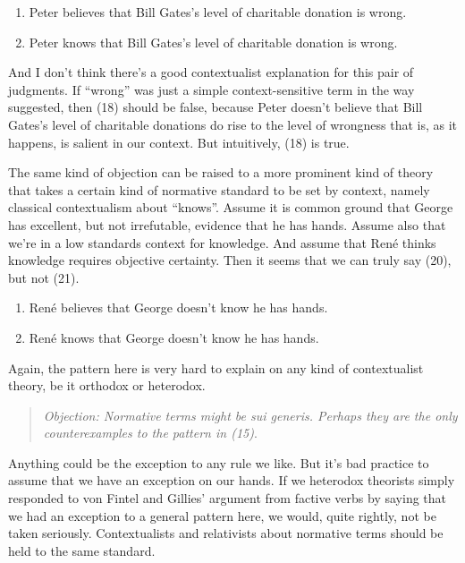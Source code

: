 \documentclass[
  10pt,
  letterpaper,
  DIV=11,
  numbers=noendperiod,
  twoside]{scrartcl}
\providecommand{\tightlist}{%
  \setlength{\itemsep}{0pt}\setlength{\parskip}{0pt}}\usepackage{longtable,booktabs,array}
\begin{document}
\begin{enumerate}
\def\labelenumi{\arabic{enumi}.}
\setcounter{enumi}{17}
\tightlist
\item
  Peter believes that Bill Gates's level of charitable donation is
  wrong.
\item
  Peter knows that Bill Gates's level of charitable donation is wrong.
\end{enumerate}

And I don't think there's a good contextualist explanation for this pair
of judgments. If ``wrong'' was just a simple context-sensitive term in
the way suggested, then (18) should be false, because Peter doesn't
believe that Bill Gates's level of charitable donations do rise to the
level of wrongness that is, as it happens, is salient in our context.
But intuitively, (18) is true.

The same kind of objection can be raised to a more prominent kind of
theory that takes a certain kind of normative standard to be set by
context, namely classical contextualism about ``knows''. Assume it is
common ground that George has excellent, but not irrefutable, evidence
that he has hands. Assume also that we're in a low standards context for
knowledge. And assume that René thinks knowledge requires objective
certainty. Then it seems that we can truly say (20), but not (21).

\begin{enumerate}
\def\labelenumi{\arabic{enumi}.}
\setcounter{enumi}{19}
\tightlist
\item
  René believes that George doesn't know he has hands.
\item
  René knows that George doesn't know he has hands.
\end{enumerate}

Again, the pattern here is very hard to explain on any kind of
contextualist theory, be it orthodox or heterodox.

\begin{quote}
\emph{Objection: Normative terms might be sui generis. Perhaps they are
the only counterexamples to the pattern in (15)}.
\end{quote}

Anything could be the exception to any rule we like. But it's bad
practice to assume that we have an exception on our hands. If we
heterodox theorists simply responded to von Fintel and Gillies' argument
from factive verbs by saying that we had an exception to a general
pattern here, we would, quite rightly, not be taken seriously.
Contextualists and relativists about normative terms should be held to
the same standard.
\end{document}
